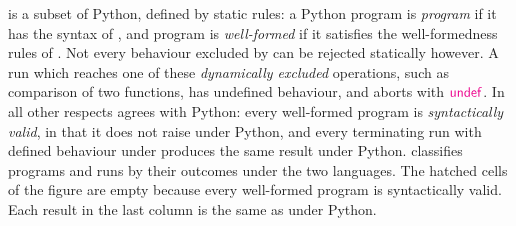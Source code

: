 \PurePy is a subset of Python, defined by static rules: a Python program is \emph{\aPurePy program} if it has the
syntax of , and \aPurePy program is \emph{well-formed} if it satisfies the well-formedness rules of
. Not every behaviour excluded by \PurePy can be rejected statically
however. A run which reaches one of these \emph{dynamically excluded} operations, such as comparison
of two functions, has undefined behaviour, and aborts with $\textcolor{magenta}{\mathsf{undef}}$. In all other respects \PurePy agrees with
Python: every well-formed program is \emph{syntactically valid}, in that it does not raise 
under Python, and every terminating run with defined behaviour under \PurePy produces the same result under Python.
 classifies programs and runs by their outcomes under the two languages. The hatched cells of the
figure are empty because every well-formed program is syntactically valid. Each result in the last column is the same
as under Python.
